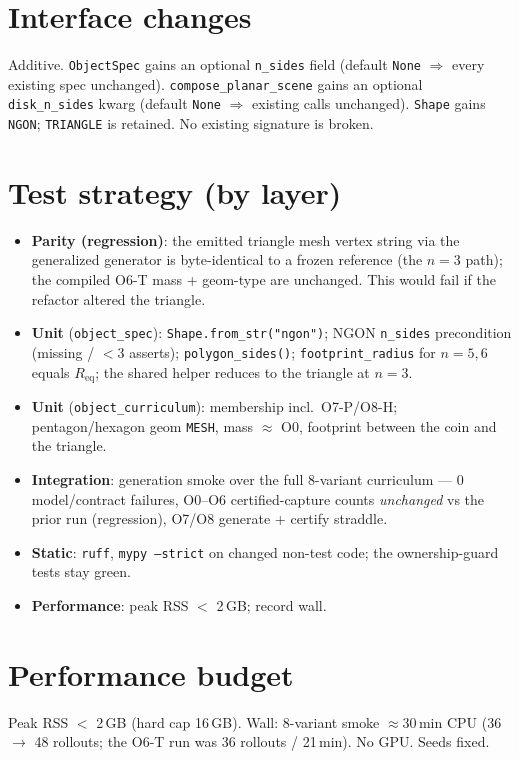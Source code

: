 \documentclass[11pt]{article}
\begin{document}
\section{Interface changes}
Additive. \texttt{ObjectSpec} gains an optional \texttt{n\_sides} field (default \texttt{None} $\Rightarrow$
every existing spec unchanged). \texttt{compose\_planar\_scene} gains an optional \texttt{disk\_n\_sides}
kwarg (default \texttt{None} $\Rightarrow$ existing calls unchanged). \texttt{Shape} gains \texttt{NGON};
\texttt{TRIANGLE} is retained. No existing signature is broken.

\section{Test strategy (by layer)}
\begin{itemize}[nosep]
  \item \textbf{Parity (regression)}: the emitted triangle mesh vertex string via the generalized
    generator is byte-identical to a frozen reference (the $n=3$ path); the compiled O6-T mass +
    geom-type are unchanged. This would fail if the refactor altered the triangle.
  \item \textbf{Unit} (\texttt{object\_spec}): \texttt{Shape.from\_str("ngon")}; NGON \texttt{n\_sides}
    precondition (missing / $<3$ asserts); \texttt{polygon\_sides()}; \texttt{footprint\_radius} for
    $n=5,6$ equals $R_{\mathrm{eq}}$; the shared helper reduces to the triangle at $n=3$.
  \item \textbf{Unit} (\texttt{object\_curriculum}): membership incl.\ O7-P/O8-H; pentagon/hexagon
    geom \texttt{MESH}, mass $\approx$ O0, footprint between the coin and the triangle.
  \item \textbf{Integration}: generation smoke over the full 8-variant curriculum --- 0 model/contract
    failures, O0--O6 certified-capture counts \emph{unchanged} vs the prior run (regression), O7/O8
    generate + certify straddle.
  \item \textbf{Static}: \texttt{ruff}, \texttt{mypy --strict} on changed non-test code; the
    ownership-guard tests stay green.
  \item \textbf{Performance}: peak RSS $<$ 2\,GB; record wall.
\end{itemize}

\section{Performance budget}
Peak RSS $<$ 2\,GB (hard cap 16\,GB). Wall: 8-variant smoke $\approx 30$\,min CPU (36 $\to$ 48
rollouts; the O6-T run was 36 rollouts / 21\,min). No GPU. Seeds fixed.
\end{document}
